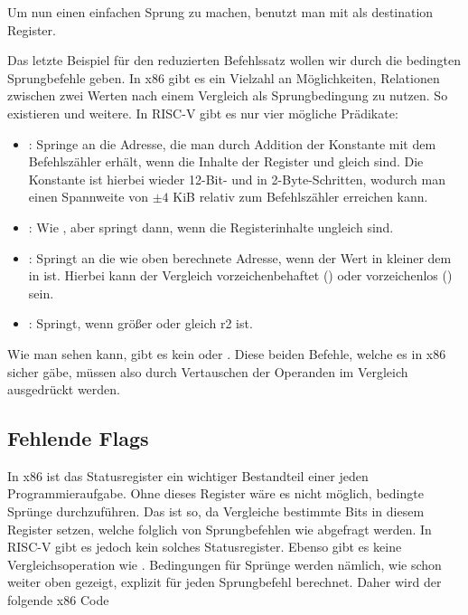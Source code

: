 Um nun einen einfachen Sprung zu machen, benutzt man  mit  als
destination Register.

Das letzte Beispiel für den reduzierten Befehlssatz wollen wir durch die
bedingten Sprungbefehle geben. In x86 gibt es ein Vielzahl an Möglichkeiten,
Relationen zwischen zwei Werten nach einem Vergleich als Sprungbedingung zu
nutzen. So existieren  und weitere. In
RISC-V gibt es nur vier mögliche Prädikate:

\begin{itemize}
  \item {}: Springe an die Adresse, die man durch
    Addition der Konstante  mit dem Befehlszähler erhält, wenn
    die Inhalte der Register  und  gleich sind. Die Konstante
    ist hierbei wieder 12-Bit- und in 2-Byte-Schritten, wodurch man einen
    Spannweite von $\pm 4$ KiB relativ zum Befehlszähler erreichen kann.
  \item {}: Wie , aber springt dann, wenn
    die Registerinhalte ungleich sind.
  \item {}: Springt an die wie oben berechnete
    Adresse, wenn der Wert in  kleiner dem in  ist. Hierbei
    kann der Vergleich vorzeichenbehaftet () oder vorzeichenlos
    () sein.
  \item {}: Springt, wenn  größer oder
    gleich r2 ist.
\end{itemize}

Wie man sehen kann, gibt es kein  oder . Diese beiden
Befehle, welche es in x86 sicher gäbe, müssen also durch Vertauschen
der Operanden im Vergleich ausgedrückt werden.

\subsection{Fehlende Flags}

In x86 ist das Statusregister ein wichtiger Bestandteil einer jeden
Programmieraufgabe. Ohne dieses Register wäre es nicht möglich, bedingte Sprünge
durchzuführen. Das ist so, da Vergleiche bestimmte Bits in diesem Register setzen,
welche folglich von Sprungbefehlen wie  abgefragt werden. In RISC-V
gibt es jedoch kein solches Statusregister. Ebenso gibt es keine
Vergleichsoperation wie . Bedingungen für Sprünge werden nämlich, wie schon
weiter oben gezeigt, explizit für jeden Sprungbefehl berechnet. Daher wird der
folgende x86 Code

